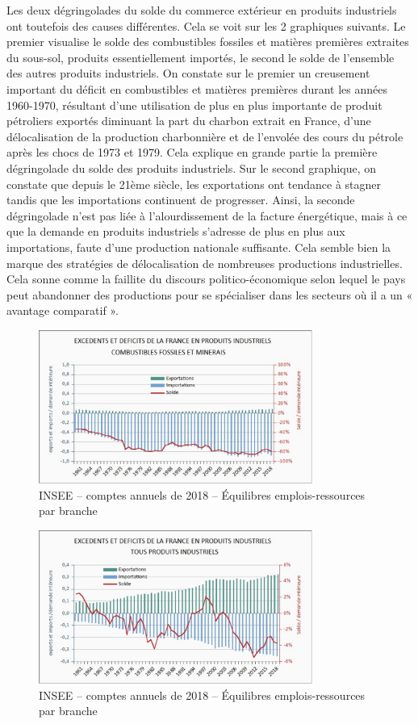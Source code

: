 \documentclass[a4paper]{article}
\begin{document}
Les deux dégringolades du solde du commerce extérieur en produits industriels ont toutefois des causes différentes. Cela se voit sur les 2 graphiques suivants. Le premier visualise le solde des combustibles fossiles et matières premières extraites du sous-sol, produits essentiellement importés, le second le solde de l’ensemble des autres produits industriels. On constate sur le premier un creusement important du déficit en combustibles et matières premières durant les années 1960-1970, résultant d’une utilisation de plus en plus importante de produit pétroliers exportés diminuant la part du charbon extrait en France, d’une délocalisation de la production charbonnière et de l’envolée des cours du pétrole après les chocs de 1973 et 1979. Cela explique en grande partie la première dégringolade du solde des produits industriels. Sur le second graphique, on constate que depuis le 21ème siècle, les exportations ont tendance à stagner tandis que les importations continuent de progresser. Ainsi, la seconde dégringolade n’est pas liée à l’alourdissement de la facture énergétique, mais à ce que la demande en produits industriels s’adresse de plus en plus aux importations, faute d’une production nationale suffisante. Cela semble bien la marque des stratégies de délocalisation de nombreuses productions industrielles. Cela sonne comme la faillite du discours politico-économique selon lequel le pays peut abandonner des productions pour se spécialiser dans les secteurs où il a un « avantage comparatif ».


\begin{figure}[H]
\centering
\includegraphics*[width=0.8\textwidth]{images/excedents}
\caption{INSEE – comptes annuels de 2018 – Équilibres emplois-ressources par branche}
\label{fig:excedents}
\end{figure}


\begin{figure}[H]
\centering
\includegraphics*[width=0.8\textwidth]{images/importations}
\caption{INSEE – comptes annuels de 2018 – Équilibres emplois-ressources par branche}
\label{fig:excedents-2}
\end{figure}
\end{document}

